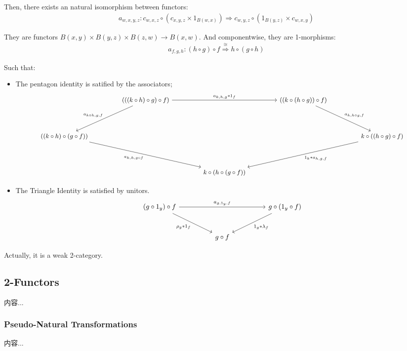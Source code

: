 \documentclass[Total.tex]{subfiles}
\begin{document}
\begin{Def}
\begin{itemize}
					Then, there exists an natural isomorphism between functors:
					\begin{gather*}
						a_{w,x,y,z}:c_{w,x,z}\circ (c_{x,y,z}\times 1_{B(w,x)})\Rightarrow  c_{w,y,z}\circ (1_{B(y,z)}\times c_{w,x,y})
					\end{gather*}
					
					They are functors $B(x,y)\times B(y,z)\times B(z,w)\rightarrow B(x,w)$. And componentwise, they are 1-morphisms:
					\begin{gather*}
						a_{f,g,h}:(h\circ g)\circ f\stackrel{\cong}{\Rightarrow} h\circ (g\circ h)
					\end{gather*}
				\end{itemize}
				
				Such that:
				\begin{itemize}
					\item The pentagon identity is satified by the associators;
					\[\small
					\begin{tikzcd}[column sep=4.5em,row sep=4em]
						& (((k\circ h)\circ g)\circ f)
						\arrow[rr,"a_{k,h,g}\ast 1_f"]
						\arrow[dl,"a_{k\circ h,g,f}"']
						&& ((k\circ (h\circ g))\circ f)
						\arrow[dr,"a_{k,h\circ g,f}"] & \\
						((k\circ h)\circ (g\circ f))
						\arrow[drr,"a_{k,h,g\circ f}"']
						&&&& k\circ ((h\circ g)\circ f)
						\arrow[dll,"1_k\ast a_{h,g,f}"] \\
						&& k\circ (h\circ (g\circ f)) &&
					\end{tikzcd}
					\]
					\item The Triangle Identity is satisfied by unitors.
					\[
					\begin{tikzcd}[column sep=huge,row sep=large]
						(g\circ 1_y)\circ f
						\arrow[rr,"a_{g,1_y,f}"]
						\arrow[dr,"\rho_g\ast 1_f"']
						&&
						g\circ(1_y\circ f)
						\arrow[dl,"1_g\ast\lambda_f"]
						\\
						&
						g\circ f
						&
					\end{tikzcd}
					\]
				\end{itemize}
			\end{Def}
			
			Actually, it is a weak 2-category.
			\subsection{2-Functors}
			\begin{Def}
				内容...
			\end{Def}
			\subsubsection{Pseudo-Natural Transformations}
				\begin{Def}
					内容...
				\end{Def}
\end{document}
